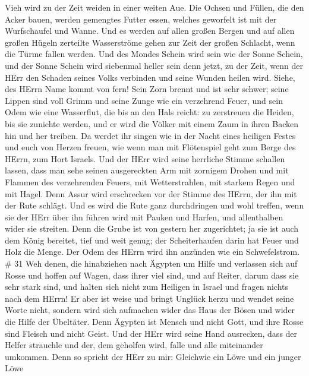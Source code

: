 Vieh wird zu der Zeit weiden in einer weiten Aue.  Die
Ochsen und Füllen, die den Acker bauen, werden gemengtes Futter essen,
welches geworfelt ist mit der Wurfschaufel und Wanne.  Und
es werden auf allen großen Bergen und auf allen großen Hügeln zerteilte
Wasserströme gehen zur Zeit der großen Schlacht, wenn die Türme fallen
werden.  Und des Mondes Schein wird sein wie der Sonne
Schein, und der Sonne Schein wird siebenmal heller sein denn jetzt, zu
der Zeit, wenn der HErr den Schaden seines Volks verbinden und seine
Wunden heilen wird.  Siehe, des HErrn Name kommt von fern!
Sein Zorn brennt und ist sehr schwer; seine Lippen sind voll Grimm und
seine Zunge wie ein verzehrend Feuer,  und sein Odem wie
eine Wasserflut, die bis an den Hals reicht: zu zerstreuen die Heiden,
bis sie zunichte werden, und er wird die Völker mit einem Zaum in ihren
Backen hin und her treiben.  Da werdet ihr singen wie in
der Nacht eines heiligen Festes und euch von Herzen freuen, wie wenn man
mit Flötenspiel geht zum Berge des HErrn, zum Hort Israels.
 Und der HErr wird seine herrliche Stimme schallen lassen,
dass man sehe seinen ausgereckten Arm mit zornigem Drohen und mit
Flammen des verzehrenden Feuers, mit Wetterstrahlen, mit starkem Regen
und mit Hagel.  Denn Assur wird erschrecken vor der Stimme
des HErrn, der ihn mit der Rute schlägt.  Und es wird die
Rute ganz durchdringen und wohl treffen, wenn sie der HErr über ihn
führen wird mit Pauken und Harfen, und allenthalben wider sie streiten.
 Denn die Grube ist von gestern her zugerichtet; ja sie ist
auch dem König bereitet, tief und weit genug; der Scheiterhaufen darin
hat Feuer und Holz die Menge. Der Odem des HErrn wird ihn anzünden wie
ein Schwefelstrom. \# 31  Weh denen, die hinabziehen nach
Ägypten um Hilfe und verlassen sich auf Rosse und hoffen auf Wagen, dass
ihrer viel sind, und auf Reiter, darum dass sie sehr stark sind, und
halten sich nicht zum Heiligen in Israel und fragen nichts nach dem
HErrn!  Er aber ist weise und bringt Unglück herzu und
wendet seine Worte nicht, sondern wird sich aufmachen wider das Haus der
Bösen und wider die Hilfe der Übeltäter.  Denn Ägypten ist
Mensch und nicht Gott, und ihre Rosse sind Fleisch und nicht Geist. Und
der HErr wird seine Hand ausrecken, dass der Helfer strauchle und der,
dem geholfen wird, falle und alle miteinander umkommen. 
Denn so spricht der HErr zu mir: Gleichwie ein Löwe und ein junger Löwe
